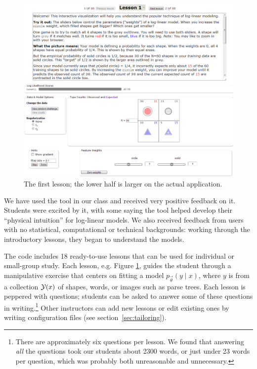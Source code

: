 \documentclass[11pt,letterpaper]{article}
\newcommand{\Note}[1]{}
\renewcommand{\Note}[1]{\hl{[#1]}}  %
\newcommand{\NoteSigned}[3]{{\sethlcolor{#2}\Note{#1: #3}}}
\newcommand{\NoteFF}[1]{\NoteSigned{FF}{LightBlue}{#1}}
\newcommand{\NoteJE}[1]{\NoteSigned{JE}{LightGreen}{#1}}
\newcommand{\NumLessons}[0]{18}%
\begin{document}
\begin{figure}
\centering
\includegraphics[scale=.49]{images/lesson1-051313-intro-zoom-instmore.PNG}
\caption{The first lesson; the lower half is larger on the actual
  application.
}
\label{fig:lesson1}
\end{figure}

We have used the tool in our class and received very positive feedback on it. 
Students were excited by it, with some saying the tool helped develop their 
``physical intuition'' for log-linear models.
We also received feedback from users 
with no statistical, computational or technical backgrounds: working through the introductory 
lessons, they began to understand the models.

The code includes \NumLessons{} ready-to-use lessons that can be used
for individual or small-group study.  Each lesson, e.g. Figure \ref{fig:lesson1}, guides the student
through a manipulative exercise that centers on fitting a model
$p_{\vec{\theta}}(y \mid x)$, where $y$ is from a collection ${\cal Y}(x)$ of
shapes, words, or images such as parse trees.  Each lesson is peppered
with questions; students can be asked to answer some of these
questions in writing.\footnote{There are approximately six questions per
lesson. We found that answering {\em all} the
  questions took our students about 2300 words, or just under 23 words per question, which
  was probably both unreasonable and unnecessary.}
Other instructors can add new lessons or edit existing ones by writing 
configuration files (see section~\ref{sec:tailoring}).
\end{document}
